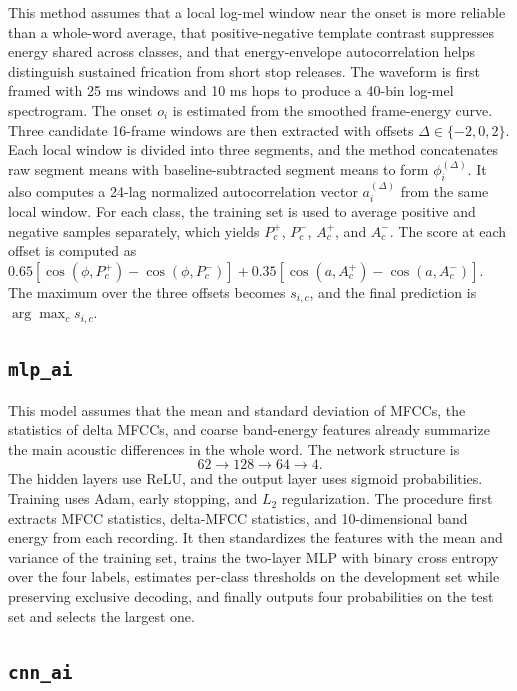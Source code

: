 This method assumes that a local log-mel window near the onset is more reliable than a whole-word average, that positive-negative template contrast suppresses energy shared across classes, and that energy-envelope autocorrelation helps distinguish sustained frication from short stop releases. The waveform is first framed with 25 ms windows and 10 ms hops to produce a 40-bin log-mel spectrogram. The onset $o_i$ is estimated from the smoothed frame-energy curve. Three candidate 16-frame windows are then extracted with offsets $\Delta\in\{-2,0,2\}$. Each local window is divided into three segments, and the method concatenates raw segment means with baseline-subtracted segment means to form $\phi_i^{(\Delta)}$. It also computes a 24-lag normalized autocorrelation vector $a_i^{(\Delta)}$ from the same local window. For each class, the training set is used to average positive and negative samples separately, which yields $P_c^+$, $P_c^-$, $A_c^+$, and $A_c^-$. The score at each offset is computed as $0.65[\cos(\phi,P_c^+)-\cos(\phi,P_c^-)]+0.35[\cos(a,A_c^+)-\cos(a,A_c^-)]$. The maximum over the three offsets becomes $s_{i,c}$, and the final prediction is $\arg\max_c s_{i,c}$.

\subsection{\texttt{mlp\_ai}}
\label{alg:mlp-ai}

This model assumes that the mean and standard deviation of MFCCs, the statistics of delta MFCCs, and coarse band-energy features already summarize the main acoustic differences in the whole word. The network structure is
\[
62\rightarrow128\rightarrow64\rightarrow4.
\]
The hidden layers use ReLU, and the output layer uses sigmoid probabilities. Training uses Adam, early stopping, and $L_2$ regularization. The procedure first extracts MFCC statistics, delta-MFCC statistics, and 10-dimensional band energy from each recording. It then standardizes the features with the mean and variance of the training set, trains the two-layer MLP with binary cross entropy over the four labels, estimates per-class thresholds on the development set while preserving exclusive decoding, and finally outputs four probabilities on the test set and selects the largest one.

\subsection{\texttt{cnn\_ai}}
\label{alg:cnn-ai}

